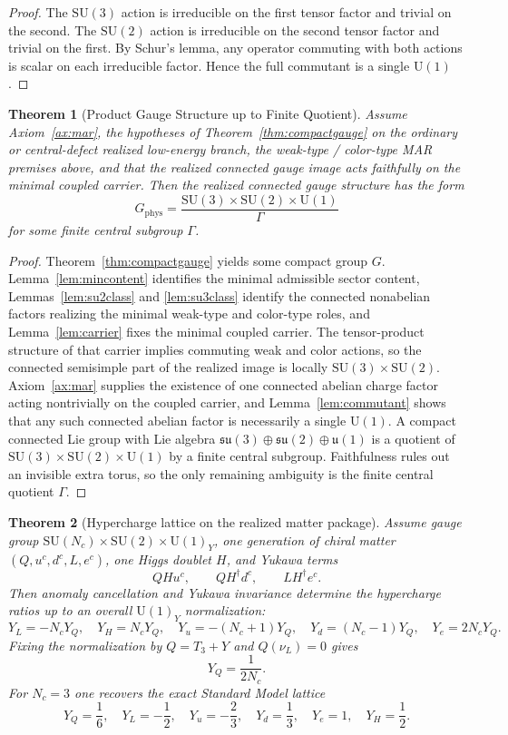 \documentclass[11pt]{article}
\newtheorem{theorem}{Theorem}[section]
\newcommand{\SU}{\mathrm{SU}}
\newcommand{\U}{\mathrm{U}}
\begin{document}
\begin{proof}
The $\SU(3)$ action is irreducible on the first tensor factor and trivial on the second. The $\SU(2)$ action is irreducible on the second tensor factor and trivial on the first. By Schur's lemma, any operator commuting with both actions is scalar on each irreducible factor. Hence the full commutant is a single $\U(1)$.
\end{proof}

\begin{theorem}[Product Gauge Structure up to Finite Quotient]\label{thm:sm}
Assume Axiom~\ref{ax:mar}, the hypotheses of Theorem~\ref{thm:compactgauge} on the ordinary or central-defect realized low-energy branch, the weak-type / color-type MAR premises above, and that the realized connected gauge image acts faithfully on the minimal coupled carrier. Then the realized connected gauge structure has the form
\[
G_{\mathrm{phys}}=
\frac{\SU(3)\times\SU(2)\times\U(1)}{\Gamma}
\]
for some finite central subgroup $\Gamma$.
\end{theorem}

\begin{proof}
Theorem~\ref{thm:compactgauge} yields some compact group $G$. Lemma~\ref{lem:mincontent} identifies the minimal admissible sector content, Lemmas~\ref{lem:su2class} and \ref{lem:su3class} identify the connected nonabelian factors realizing the minimal weak-type and color-type roles, and Lemma~\ref{lem:carrier} fixes the minimal coupled carrier. The tensor-product structure of that carrier implies commuting weak and color actions, so the connected semisimple part of the realized image is locally $\SU(3)\times\SU(2)$. Axiom~\ref{ax:mar} supplies the existence of one connected abelian charge factor acting nontrivially on the coupled carrier, and Lemma~\ref{lem:commutant} shows that any such connected abelian factor is necessarily a single $\U(1)$. A compact connected Lie group with Lie algebra $\mathfrak{su}(3)\oplus\mathfrak{su}(2)\oplus\mathfrak{u}(1)$ is a quotient of $\SU(3)\times\SU(2)\times\U(1)$ by a finite central subgroup. Faithfulness rules out an invisible extra torus, so the only remaining ambiguity is the finite central quotient $\Gamma$.
\end{proof}

\begin{theorem}[Hypercharge lattice on the realized matter package]\label{thm:hypercharge}
Assume gauge group $\SU(N_c)\times\SU(2)\times\U(1)_Y$, one generation of chiral matter $(Q,u^c,d^c,L,e^c)$, one Higgs doublet $H$, and Yukawa terms
\[
QHu^c,\qquad QH^\dagger d^c,\qquad LH^\dagger e^c.
\]
Then anomaly cancellation and Yukawa invariance determine the hypercharge ratios up to an overall \(\U(1)_Y\) normalization:
\[
Y_L=-N_cY_Q,\quad
Y_H=N_cY_Q,\quad
Y_u=-(N_c+1)Y_Q,\quad
Y_d=(N_c-1)Y_Q,\quad
Y_e=2N_cY_Q.
\]
Fixing the normalization by $Q=T_3+Y$ and $Q(\nu_L)=0$ gives
\[
Y_Q=\frac{1}{2N_c}.
\]
For $N_c=3$ one recovers the exact Standard Model lattice
\[
Y_Q=\frac16,\quad
Y_L=-\frac12,\quad
Y_u=-\frac23,\quad
Y_d=\frac13,\quad
Y_e=1,\quad
Y_H=\frac12.
\]
\end{theorem}
\end{document}
